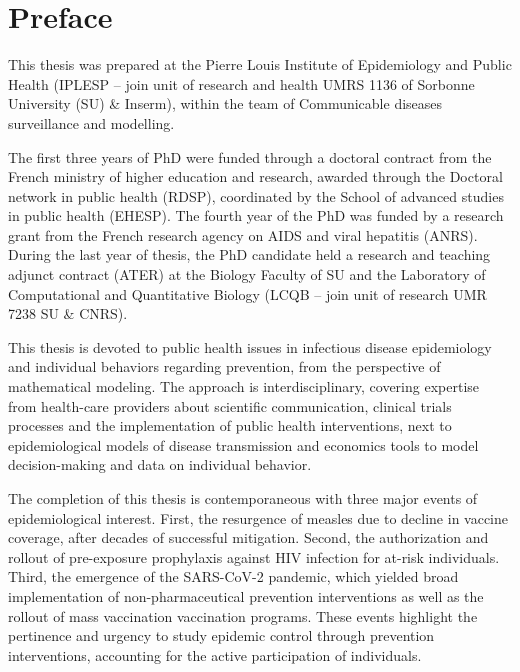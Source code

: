 \chapter*{Preface} 

This thesis was prepared at the Pierre Louis Institute of Epidemiology and Public Health (IPLESP -- join unit of research and health UMRS 1136 of Sorbonne University (SU) \& Inserm), within the team of Communicable diseases surveillance and modelling.

The first three years of PhD were funded through a doctoral contract from the French ministry of higher education and research, awarded through the Doctoral network in public health (RDSP), coordinated by the School of advanced studies in public health (EHESP). The fourth year of the PhD was funded by a research grant from the French research agency on AIDS and viral hepatitis (ANRS). During the last year of thesis, the PhD candidate held a research and teaching adjunct contract (ATER) at the Biology Faculty of SU and the Laboratory of Computational and Quantitative  Biology (LCQB -- join unit of research UMR 7238 SU \& CNRS).


This thesis is devoted to public health issues in infectious disease epidemiology and individual behaviors regarding prevention,  from the perspective of mathematical modeling. The approach is interdisciplinary, covering expertise from health-care providers about scientific communication, clinical trials processes and the implementation of public health interventions, next to epidemiological models of disease transmission and economics tools to model decision-making and data on individual behavior.

The completion of this thesis is contemporaneous with three major events of epidemiological interest. First, the resurgence of measles due to decline in vaccine coverage, after decades of successful mitigation. Second, the authorization and rollout of pre-exposure prophylaxis against HIV infection for at-risk individuals. Third, the emergence of the SARS-CoV-2 pandemic, which yielded broad implementation of non-pharmaceutical prevention interventions as well as the rollout of mass vaccination vaccination programs. These events highlight the pertinence and urgency to study epidemic control through prevention interventions, accounting for the active participation of individuals. 

